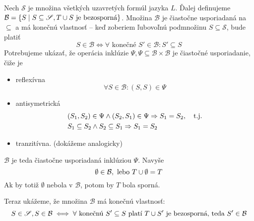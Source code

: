 \begin{dokaz}
    Nech $\mathscr{S}$ je množina všetkých uzavretých formúl jazyka $L$.
    Ďalej definujeme
    $\mathcal{B} = \{ S \mid S \subseteq \mathscr{S}, T \cup S
        \mbox{ je bezosporná}\}$.
    Množina $\mathcal{B}$ je čiastočne usporiadaná na $\subseteq$ a
    má konečnú vlastnosť -- keď zoberiem ľubovoľnú podmnožinu
    $S \subseteq \mathscr{S}$, bude platiť
    \begin{equation*}
        S \in \mathcal{B} \iff \forall \mbox{ konečné } S' \in
        \mathcal{B}: S' \subseteq S
    \end{equation*}
     Potrebujeme ukázať, že operácia inklúzie $\Psi, \Psi \subseteq
     \mathcal{B}\times\mathcal{B}$ je čiastočné usporiadanie, čiže je
    \begin{itemize}
        \item reflexívna
            \begin{equation*}
                \forall S \in \mathcal{B}: (S,S) \in \Psi
            \end{equation*}
        \item antisymetrická
            \begin{align*}
                &(S_1,S_2) \in \Psi \land (S_2,S_1) \in \Psi
                    \Rightarrow S_1 = S_2, \quad \mbox{t.j.} \\
                &S_1 \subseteq S_2 \land S_2 \subseteq S_1 \Rightarrow S_1 = S_2
            \end{align*}
        \item tranzitívna. (dokážeme analogicky)
    \end{itemize}
    $\mathcal{B}$ je teda čiastočne usporiadaná inklúziou $\Psi$.
    Navyše
    \begin{equation*}
        \emptyset \in \mathcal{B}, \mbox{ lebo } T \cup \emptyset = T
    \end{equation*}
    Ak by totiž $\emptyset$ nebola v $\mathcal{B}$, potom by $T$ bola sporná.

    Teraz ukážeme, že množina $\mathcal{B}$ má konečnú vlastnosť:
    \begin{equation*}
        S \in \mathscr{S}, S \in \mathcal{B} \iff \forall \textrm{
        konečnú }S' \subseteq S \textrm{ platí } T \cup S' 
            \textrm{ je bezosporná, teda }S' \in \mathcal{B}
    \end{equation*}
   

\end{dokaz}
